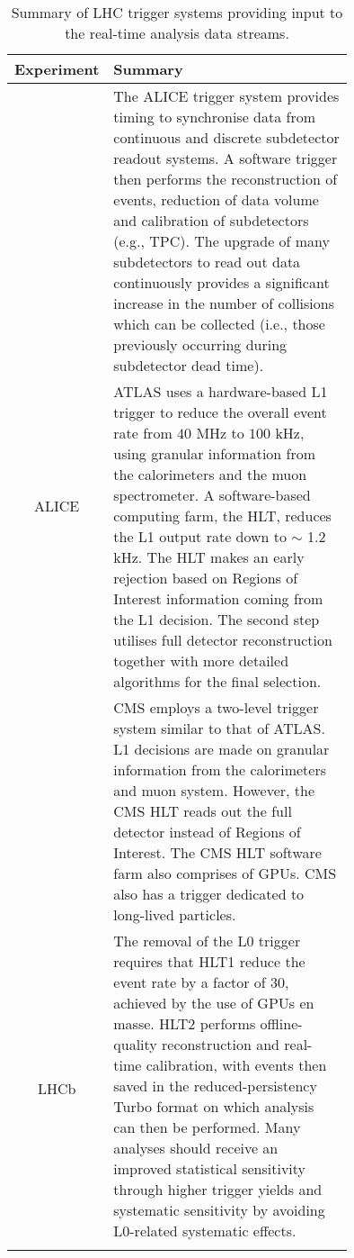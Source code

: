 \begin{table}[h!]
    \centering
    \begin{tabular}{c|p{0.75\linewidth}}
        \thickhline
        \small{\textbf{Experiment}} & \textbf{Summary} \\
        \hline\hline
        \multirow{3}{*}{\small{ALICE}}
            & \small{The ALICE trigger system provides timing to synchronise data from continuous and discrete subdetector readout systems. A software trigger then performs the reconstruction of events, reduction of data volume and calibration of subdetectors (e.g., TPC). The upgrade of many subdetectors to read out data continuously provides a significant increase in the number of collisions which can be collected (i.e., those previously occurring during subdetector dead time).} \\
        \hline
        \multirow{3}{*}{\small{ATLAS}}
            & \small{ATLAS uses a hardware-based L1 trigger to reduce the overall event rate from $40$ MHz to $100$ kHz, using granular information from the calorimeters and the muon spectrometer. A software-based computing farm, the HLT, reduces the L1 output rate down to $\sim$ 1.2 kHz. The HLT makes an early rejection based on Regions of Interest information coming from the L1 decision. The second step utilises full detector reconstruction together with more detailed algorithms for the final selection.} \\ \hline
        \multirow{3}{*}{\small{CMS}}
            & CMS employs a two-level trigger system similar to that of ATLAS. L1 decisions are made on granular information from the calorimeters and muon system. However, the CMS HLT reads out the full detector instead of Regions of Interest. The CMS HLT software farm also comprises of GPUs. CMS also has a trigger dedicated to long-lived particles. \\ \hline
        \multirow{3}{*}{\small{LHCb}}
            & \small{The removal of the L0 trigger requires that HLT1 reduce the event rate by a factor of 30, achieved by the use of GPUs en masse. HLT2 performs offline-quality reconstruction and real-time calibration, with events then saved in the reduced-persistency Turbo format on which analysis can then be performed. Many analyses should receive an improved statistical sensitivity through higher trigger yields and systematic sensitivity by avoiding L0-related systematic effects.} \\
        \thickhline
    \end{tabular}
    \caption{Summary of LHC trigger systems providing input to the real-time analysis data streams.}
    \label{trigger-table}
\end{table}

